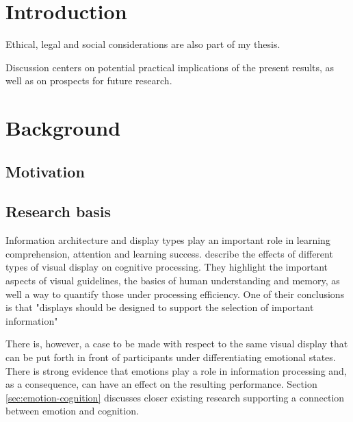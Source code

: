 \section{Introduction}




Ethical, legal and social considerations are also part of my thesis.


Discussion centers on potential practical implications of the present results, as well as on prospects for future research.

\clearpage

\section{Background}

	\subsection{Motivation}
	
	
	
		
	\subsection{Research basis} \label{sec:research}
	
	
	Information architecture and display types play an important role in learning comprehension, attention and learning success. \cite{McCrudden2017} describe the effects of different types of visual display on cognitive processing. They highlight the important aspects of visual guidelines, the basics of human understanding and  memory, as well a way to quantify those under processing efficiency. One of their conclusions is that "displays should be designed to support the selection of important information" \cite[p.633]{McCrudden2017}
	
	There is, however, a case to be made with respect to the same visual display that can be put forth in front of participants under differentiating emotional states. There is strong evidence that emotions play a role in information processing and, as a consequence, can have an effect on the resulting performance. Section \ref{sec:emotion-cognition} discusses closer existing research supporting a connection between emotion and cognition.
	
